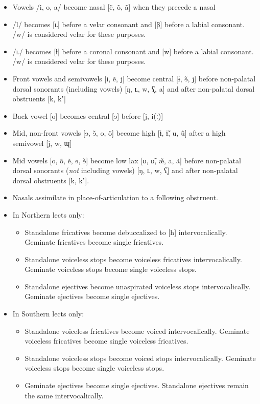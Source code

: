\documentclass[a4paper,11pt,oneside,openany]{memoir}
\newcommand{\bripa}[1]{[#1]}
\newcommand{\phipa}[1]{/#1/}
\newcommand{\bilav}{β}
\newcommand{\darkl}{ɫ}
\newcommand{\engma}{ŋ}
\newcommand{\vell}{ʟ}
\newcommand{\velprox}{ɰ}
\newcommand{\pharox}{ʕ}
\newcommand{\bari}{ɨ}
\newcommand{\sche}{ɘ}
\newcommand{\aesh}{æ}
\newcommand{\ahoh}{ɒ}
\newcommand{\jekt}{ʼ}
\newcommand{\nav}{̃}
\newcommand{\dwnwrd}{̞}
\newcommand{\lgth}{ː}
\begin{document}
\begin{itemize}
    \item Vowels \phipa{i, o, a} become nasal \bripa{e\nav, o\nav, a\nav} when they precede a nasal
    \item \phipa{l} becomes \bripa{\vell} before a velar consonant and \bripa{\bilav\dwnwrd} before a labial consonant. \phipa{w} is considered velar for these purposes.
    \item \phipa{\vell} becomes \bripa{\darkl} before a coronal consonant and \bripa{w} before a labial consonant. \phipa{w} is considered velar for these purposes.
    \item Front vowels and semivowels \bripa{i, e\nav, j} become central \bripa{\bari, \sche\nav, j} before non-palatal dorsal sonorants (including vowels) \bripa{\engma, \vell, w, \pharox\dwnwrd, a} and after non-palatal dorsal obstruents \bripa{k, k\jekt}
    \item Back vowel \bripa{o} becomes central \bripa{\sche} before \bripa{j, i(\lgth)}
    \item Mid, non-front vowels \bripa{\sche, \sche\nav, o, o\nav} become high \bripa{\bari, \bari\nav, u, u\nav} after a high semivowel \bripa{j, w, \velprox}
    \item Mid vowels \bripa{o, o\nav, e\nav, \sche, \sche\nav} become low lax \bripa{\ahoh, \ahoh\nav, \aesh\nav, a, a\nav} before non-palatal dorsal sonorants (\emph{not} including vowels) \bripa{\engma, \vell, w, \pharox\dwnwrd} and after non-palatal dorsal obstruents \bripa{k, k\jekt}.
    \item Nasals assimilate in place-of-articulation to a following obstruent.
    \item In Northern lects only:
    \begin{itemize}
        \item Standalone fricatives become debuccalized to \bripa{h} intervocalically. Geminate fricatives become single fricatives.
        \item Standalone voiceless stops become voiceless fricatives intervocalically. Geminate voiceless stops become single voiceless stops.
        \item Standalone ejectives become unaspirated voiceless stops intervocalically. Geminate ejectives become single ejectives.
    \end{itemize}
    \item In Southern lects only:
    \begin{itemize}
        \item Standalone voiceless fricatives become voiced intervocalically. Geminate voiceless fricatives become single voiceless fricatives.
        \item Standalone voiceless stops become voiced stops intervocalically. Geminate voiceless stops become single voiceless stops.
        \item Geminate ejectives become single ejectives. Standalone ejectives remain the same intervocalically.
    \end{itemize}
\end{itemize}
\end{document}
